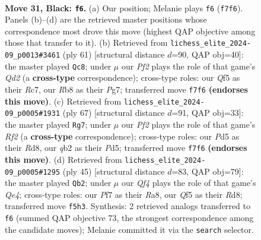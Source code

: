 \documentclass[11pt]{article}
\begin{document}
\clearpage

\begin{figure}[p]\centering
\begin{subfigure}{0.46\textwidth}\centering
\resizebox{\linewidth}{!}{%
\newchessgame
\chessboard[
  setfen={1r1rnk2/p1p2p2/8/2Pp1q1p/5P2/1P2P3/1Q1BK1RP/5BR1 b - - 2 31},
  showmover=false,
  pgfstyle=straightmove, color=movearrow, markmove={f7-f6}
]}
\caption{}
\end{subfigure}\hfill
\begin{subfigure}{0.46\textwidth}\centering
\resizebox{\linewidth}{!}{%
\newchessgame
\chessboard[
  setfen={6k1/2rq2pp/b3p3/5p2/r1PPpP2/2R5/4QBPP/2R3K1 b - - 6 31},
  showmover=false,
  pgfstyle=straightmove, color=movearrow, markmove={d7-c8}
]}
\caption{}
\end{subfigure}
\\[4pt]
\begin{subfigure}{0.46\textwidth}\centering
\resizebox{\linewidth}{!}{%
\newchessgame
\chessboard[
  setfen={3r1nk1/1p3r2/p4qp1/P2p3p/5P2/3B1R1P/1PQ5/5R1K b - - 2 34},
  showmover=false,
  pgfstyle=straightmove, color=movearrow, markmove={f7-g7}
]}
\caption{}
\end{subfigure}\hfill
\begin{subfigure}{0.46\textwidth}\centering
\resizebox{\linewidth}{!}{%
\newchessgame
\chessboard[
  setfen={r2r2k1/1pp2ppp/8/3Pq3/p3P3/n2Q4/4BP1P/2R2RK1 b - - 1 23},
  showmover=false,
  pgfstyle=straightmove, color=movearrow, markmove={e5-b2}
]}
\caption{}
\end{subfigure}
\caption{\textbf{Move 31, Black: \texttt{f6}.} (a) Our position; Melanie plays \texttt{f6} (\texttt{f7f6}). Panels (b)--(d) are the retrieved master positions whose correspondence most drove this move (highest QAP objective among those that transfer to it). (b) Retrieved from \texttt{lichess\_elite\_2024-09\_p0013\#3461} (ply 61) [structural distance $d$=90, QAP obj=40]: the master played \texttt{Qc8}; under $\mu$ our \emph{Pf2} plays the role of that game's \emph{Qd2} (a \textbf{cross-type} correspondence); cross-type roles: our \emph{Q}f5 as their \emph{R}c7, our \emph{R}b8 as their \emph{P}g7; transferred move \texttt{f7f6} \textbf{(endorses this move)}. (c) Retrieved from \texttt{lichess\_elite\_2024-09\_p0005\#1931} (ply 67) [structural distance $d$=91, QAP obj=33]: the master played \texttt{Rg7}; under $\mu$ our \emph{Pf2} plays the role of that game's \emph{Rf2} (a \textbf{cross-type} correspondence); cross-type roles: our \emph{P}d5 as their \emph{R}d8, our \emph{q}b2 as their \emph{P}d5; transferred move \texttt{f7f6} \textbf{(endorses this move)}. (d) Retrieved from \texttt{lichess\_elite\_2024-09\_p0005\#1295} (ply 45) [structural distance $d$=83, QAP obj=79]: the master played \texttt{Qb2}; under $\mu$ our \emph{Qf4} plays the role of that game's \emph{Qe4}; cross-type roles: our \emph{P}f7 as their \emph{R}a8, our \emph{Q}f5 as their \emph{R}d8; transferred move \texttt{f5h3}. Synthesis: 2 retrieved analogs transferred to \texttt{f6} (summed QAP objective 73, the strongest correspondence among the candidate moves); Melanie committed it via the \texttt{search} selector.}
\label{fig:thought-m61}
\end{figure}
\end{document}
